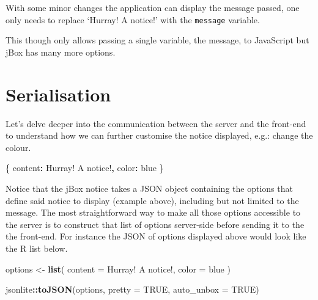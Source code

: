 \documentclass[
]{krantz}
\makeatletter
\newenvironment{Shaded}{\begin{snugshade}}{\end{snugshade}}
\newcommand{\DataTypeTok}[1]{\textcolor[rgb]{0.27,0.27,0.27}{#1}}
\newcommand{\KeywordTok}[1]{\textcolor[rgb]{0.27,0.27,0.27}{\textbf{#1}}}
\newcommand{\NormalTok}[1]{#1}
\newcommand{\OperatorTok}[1]{\textcolor[rgb]{0.43,0.43,0.43}{\textbf{#1}}}
\newcommand{\OtherTok}[1]{\textcolor[rgb]{0.37,0.37,0.37}{#1}}
\newcommand{\StringTok}[1]{\textcolor[rgb]{0.5,0.5,0.5}{#1}}
\newenvironment{kframe}{%
\medskip{}
\setlength{\fboxsep}{.8em}
 \def\at@end@of@kframe{}%
 \ifinner\ifhmode%
  \def\at@end@of@kframe{\end{minipage}}%
  \begin{minipage}{\columnwidth}%
 \fi\fi%
 \def\FrameCommand##1{\hskip\@totalleftmargin \hskip-\fboxsep
 \colorbox{shadecolor}{##1}\hskip-\fboxsep
     \hskip-\linewidth \hskip-\@totalleftmargin \hskip\columnwidth}%
 \MakeFramed {\advance\hsize-\width
   \@totalleftmargin\z@ \linewidth\hsize
   \@setminipage}}%
 {\par\unskip\endMakeFramed%
 \at@end@of@kframe}
\renewenvironment{Shaded}{\begin{kframe}}{\end{kframe}}
\makeatother
\begin{document}
With some minor changes the application can display the message passed, one only needs to replace `Hurray! A notice!' with the \texttt{message} variable.

\begin{Shaded}
\end{Shaded}

This though only allows passing a single variable, the message, to JavaScript but jBox has many more options.

\hypertarget{shiny-complete-serialise}{%
\section{Serialisation}\label{shiny-complete-serialise}}

Let's delve deeper into the communication between the server and the front-end to understand how we can further customise the notice displayed, e.g.: change the colour.

\begin{Shaded}
\begin{Highlighting}[]
\NormalTok{\{}
  \DataTypeTok{content}\OperatorTok{:} \StringTok{\textquotesingle{}Hurray! A notice!\textquotesingle{}}\OperatorTok{,}
  \DataTypeTok{color}\OperatorTok{:} \StringTok{\textquotesingle{}blue\textquotesingle{}}
\NormalTok{\}}
\end{Highlighting}
\end{Shaded}

Notice that the jBox notice takes a JSON object containing the options that define said notice to display (example above), including but not limited to the message. The most straightforward way to make all those options accessible to the server is to construct that list of options server-side before sending it to the the front-end. For instance the JSON of options displayed above would look like the R list below.

\begin{Shaded}
\begin{Highlighting}[]
\NormalTok{options \textless{}{-}}\StringTok{ }\KeywordTok{list}\NormalTok{(}
  \DataTypeTok{content =} \StringTok{\textquotesingle{}Hurray! A notice!\textquotesingle{}}\NormalTok{,}
  \DataTypeTok{color =} \StringTok{\textquotesingle{}blue\textquotesingle{}}
\NormalTok{)}

\NormalTok{jsonlite}\OperatorTok{::}\KeywordTok{toJSON}\NormalTok{(options, }\DataTypeTok{pretty =} \OtherTok{TRUE}\NormalTok{, }\DataTypeTok{auto\_unbox =} \OtherTok{TRUE}\NormalTok{)}
\end{Highlighting}
\end{Shaded}
\end{document}
